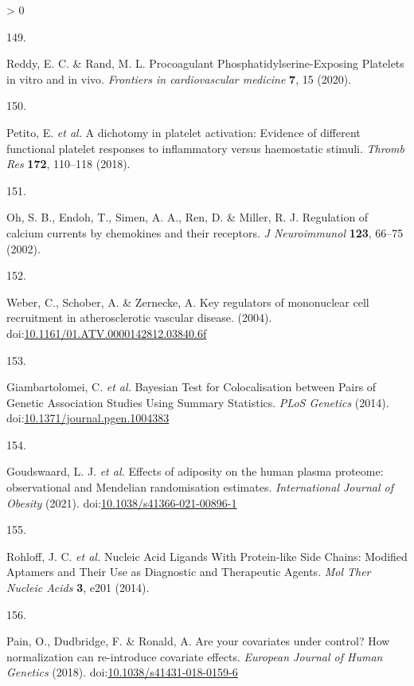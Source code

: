 \documentclass[11pt,twoside]{bristolthesis}
\newlength{\cslhangindent}
\newlength{\csllabelwidth}
\newenvironment{CSLReferences}[2] %
 {%
  \setlength{\parindent}{0pt}
  \ifodd #1 \everypar{\setlength{\hangindent}{\cslhangindent}}\ignorespaces\fi
  \ifnum #2 > 0
  \setlength{\parskip}{#2\baselineskip}
  \fi
 }%
 {}
\newcommand{\CSLLeftMargin}[1]{\parbox[t]{\csllabelwidth}{#1}}
\newcommand{\CSLRightInline}[1]{\parbox[t]{\linewidth - \csllabelwidth}{#1}\break}
\begin{document}
\begin{CSLReferences}{0}{0}
\leavevmode\hypertarget{ref-Reddy2020}{}%
\CSLLeftMargin{149. }
\CSLRightInline{Reddy, E. C. \& Rand, M. L. {Procoagulant Phosphatidylserine-Exposing Platelets in vitro and in vivo}. \emph{Frontiers in cardiovascular medicine} \textbf{7}, 15 (2020).}

\leavevmode\hypertarget{ref-Petito2018}{}%
\CSLLeftMargin{150. }
\CSLRightInline{Petito, E. \emph{et al.} {A dichotomy in platelet activation: Evidence of different functional platelet responses to inflammatory versus haemostatic stimuli}. \emph{Thromb Res} \textbf{172}, 110--118 (2018).}

\leavevmode\hypertarget{ref-Oh2002}{}%
\CSLLeftMargin{151. }
\CSLRightInline{Oh, S. B., Endoh, T., Simen, A. A., Ren, D. \& Miller, R. J. {Regulation of calcium currents by chemokines and their receptors}. \emph{J Neuroimmunol} \textbf{123}, 66--75 (2002).}

\leavevmode\hypertarget{ref-Weber2004}{}%
\CSLLeftMargin{152. }
\CSLRightInline{Weber, C., Schober, A. \& Zernecke, A. {Key regulators of mononuclear cell recruitment in atherosclerotic vascular disease}. (2004). doi:\href{https://doi.org/10.1161/01.ATV.0000142812.03840.6f}{10.1161/01.ATV.0000142812.03840.6f}}

\leavevmode\hypertarget{ref-Giambartolomei2014}{}%
\CSLLeftMargin{153. }
\CSLRightInline{Giambartolomei, C. \emph{et al.} {Bayesian Test for Colocalisation between Pairs of Genetic Association Studies Using Summary Statistics}. \emph{PLoS Genetics} (2014). doi:\href{https://doi.org/10.1371/journal.pgen.1004383}{10.1371/journal.pgen.1004383}}

\leavevmode\hypertarget{ref-Goudswaard2021}{}%
\CSLLeftMargin{154. }
\CSLRightInline{Goudswaard, L. J. \emph{et al.} {Effects of adiposity on the human plasma proteome: observational and Mendelian randomisation estimates}. \emph{International Journal of Obesity} (2021). doi:\href{https://doi.org/10.1038/s41366-021-00896-1}{10.1038/s41366-021-00896-1}}

\leavevmode\hypertarget{ref-Rohloff2014}{}%
\CSLLeftMargin{155. }
\CSLRightInline{Rohloff, J. C. \emph{et al.} {Nucleic Acid Ligands With Protein-like Side Chains: Modified Aptamers and Their Use as Diagnostic and Therapeutic Agents}. \emph{Mol Ther Nucleic Acids} \textbf{3}, e201 (2014).}

\leavevmode\hypertarget{ref-Pain2018}{}%
\CSLLeftMargin{156. }
\CSLRightInline{Pain, O., Dudbridge, F. \& Ronald, A. {Are your covariates under control? How normalization can re-introduce covariate effects}. \emph{European Journal of Human Genetics} (2018). doi:\href{https://doi.org/10.1038/s41431-018-0159-6}{10.1038/s41431-018-0159-6}}


\end{CSLReferences}
\end{document}
